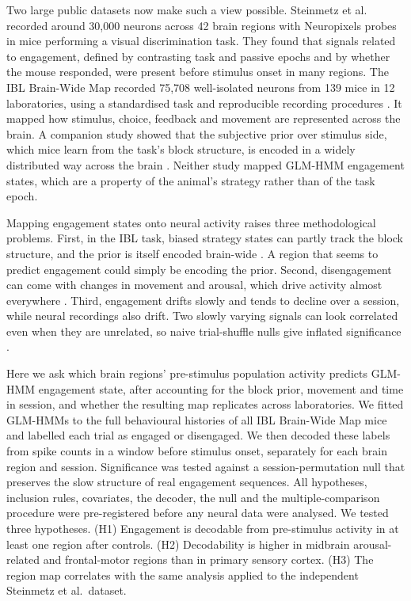 \documentclass[11pt]{article}
\begin{document}
Two large public datasets now make such a view possible. Steinmetz et al.\ \citep{steinmetz2019} recorded around 30,000 neurons across 42 brain regions with Neuropixels probes \citep{jun2017} in mice performing a visual discrimination task. They found that signals related to engagement, defined by contrasting task and passive epochs and by whether the mouse responded, were present before stimulus onset in many regions. The IBL Brain-Wide Map \citep{ibl2025bwm} recorded 75,708 well-isolated neurons from 139 mice in 12 laboratories, using a standardised task \citep{ibl2021task} and reproducible recording procedures \citep{ibl2024repro}. It mapped how stimulus, choice, feedback and movement are represented across the brain. A companion study showed that the subjective prior over stimulus side, which mice learn from the task's block structure, is encoded in a widely distributed way across the brain \citep{findling2025}. Neither study mapped GLM-HMM engagement states, which are a property of the animal's strategy rather than of the task epoch.

Mapping engagement states onto neural activity raises three methodological problems. First, in the IBL task, biased strategy states can partly track the block structure, and the prior is itself encoded brain-wide \citep{findling2025}. A region that seems to predict engagement could simply be encoding the prior. Second, disengagement can come with changes in movement and arousal, which drive activity almost everywhere \citep{stringer2019,musall2019}. Third, engagement drifts slowly and tends to decline over a session, while neural recordings also drift. Two slowly varying signals can look correlated even when they are unrelated, so naive trial-shuffle nulls give inflated significance \citep{harris2020}.

Here we ask which brain regions' pre-stimulus population activity predicts GLM-HMM engagement state, after accounting for the block prior, movement and time in session, and whether the resulting map replicates across laboratories. We fitted GLM-HMMs to the full behavioural histories of all IBL Brain-Wide Map mice and labelled each trial as engaged or disengaged. We then decoded these labels from spike counts in a window before stimulus onset, separately for each brain region and session. Significance was tested against a session-permutation null that preserves the slow structure of real engagement sequences. All hypotheses, inclusion rules, covariates, the decoder, the null and the multiple-comparison procedure were pre-registered before any neural data were analysed. We tested three hypotheses. (H1) Engagement is decodable from pre-stimulus activity in at least one region after controls. (H2) Decodability is higher in midbrain arousal-related and frontal-motor regions than in primary sensory cortex. (H3) The region map correlates with the same analysis applied to the independent Steinmetz et al.\ dataset.
\end{document}
